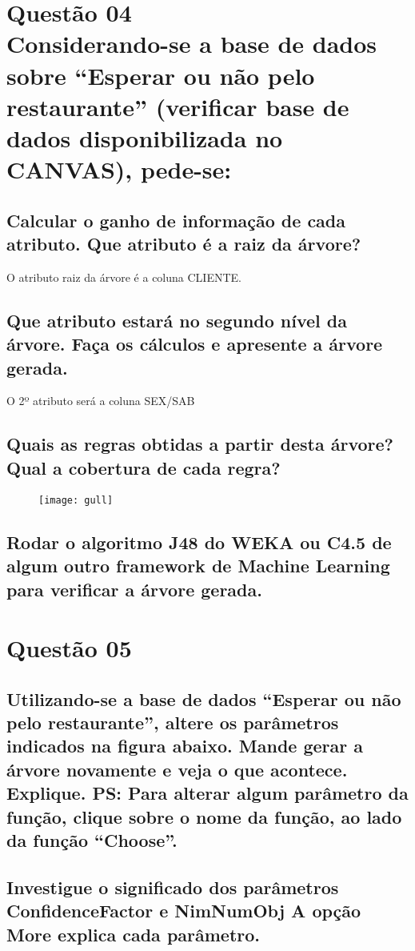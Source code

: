 \documentclass[12pt]{article}
\begin{document}
\section{Questão 04\\
Considerando-se a base de dados sobre “Esperar ou não pelo restaurante” (verificar
base de dados disponibilizada no CANVAS), pede-se:
}
\subsection{Calcular o ganho de informação de cada atributo. Que atributo é a raiz da
árvore?
}
O atributo raiz da árvore é a coluna CLIENTE.
\subsection{Que atributo estará no segundo nível da árvore. Faça os cálculos e apresente a
árvore gerada.
}
O 2º atributo será a coluna SEX/SAB
\subsection{Quais as regras obtidas a partir desta árvore? Qual a cobertura de cada regra?
}

\begin{figure}
    \begin{center}
        \texttt{[image: gull]}
      \end{center}
\end{figure}

\subsection{Rodar o algoritmo J48 do WEKA ou C4.5 de algum outro framework de
Machine Learning para verificar a árvore gerada.
}

\section{Questão 05}
\subsection{Utilizando-se a base de dados “Esperar ou não pelo restaurante”, altere os
parâmetros indicados na figura abaixo. Mande gerar a árvore novamente e veja o
que acontece. Explique.
PS: Para alterar algum parâmetro da função, clique sobre o nome da função, ao
lado da função “Choose”.
}
\subsection{Investigue o significado dos parâmetros ConfidenceFactor e NimNumObj
A opção More explica cada parâmetro.
}
\end{document}
